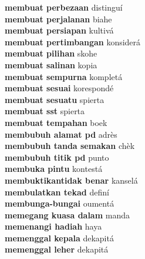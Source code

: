 \textbf{ membuat perbezaan  } distinguí \\
\textbf{ membuat perjalanan  } biahe \\
\textbf{ membuat persiapan  } kultivá \\
\textbf{ membuat pertimbangan  } konsiderá \\
\textbf{ membuat pilihan  } skohe \\
\textbf{ membuat salinan  } kopia \\
\textbf{ membuat sempurna  } kompletá \\
\textbf{ membuat sesuai  } korespondé \\
\textbf{ membuat sesuatu  } spierta \\
\textbf{ membuat sst  } spierta \\
\textbf{ membuat tempahan  } boek \\
\textbf{ membubuh alamat pd  } adrès \\
\textbf{ membubuh tanda semakan  } chèk \\
\textbf{ membubuh titik pd  } punto \\
\textbf{ membuka pintu  } kontestá \\
\textbf{ membuktikantidak benar  } kanselá \\
\textbf{ membulatkan tekad  } definí \\
\textbf{ membunga-bungai  } oumentá \\
\textbf{ memegang kuasa dalam  } manda \\
\textbf{ memenangi hadiah  } haya \\
\textbf{ memenggal kepala  } dekapitá \\
\textbf{ memenggal leher  } dekapitá \\
